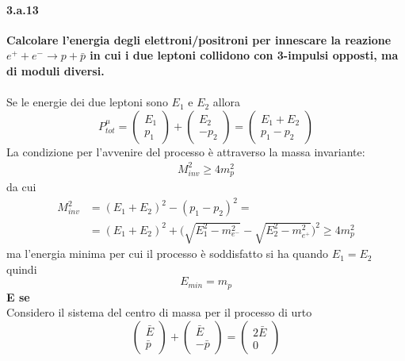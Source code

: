 \documentclass[twoside]{article}
\begin{document}
\paragraph{3.a.13}\textbf{Calcolare l'energia degli elettroni/positroni per innescare la reazione $e^+ +e^-\longrightarrow p+\bar{p}$ in cui i due leptoni collidono con 3-impulsi opposti, ma di moduli diversi.}\\
\\
Se le energie dei due leptoni sono $E_1$ e $ E_2$ allora
\begin{equation}
    P^{\mu}_{tot}=\left(\begin{array}{lr}
         E_1  \\
         p_1
    \end{array}\right)+\left(\begin{array}{lr}
         E_2  \\
         -p_2 
    \end{array}\right)=\left(\begin{array}{lr}
         E_1+E_2  \\
         p_1-p_2 
    \end{array}\right)
\end{equation}
La condizione per l'avvenire del processo è attraverso la massa invariante:
\begin{align}
    M_{inv}^2\geq4m_p^2
\end{align}
da cui
\begin{align}
    M_{inv}^2&=(E_1+E_2)^2-(p_1-p_2)^2=\\
    &=(E_1+E_2)^2+\biggl(\sqrt{E_1^2-m_{e^-}^2}-\sqrt{E_2^2-m_{e^+}^2}\biggr)^2\ge4m_p^2
\end{align}
ma l'energia minima per cui il processo è soddisfatto si ha quando $E_1=E_2$ quindi
\begin{equation}
    E_{min}=m_{p}
\end{equation}
\textbf{E se}\\
Considero il sistema del centro di massa per il processo di urto
\begin{equation}
    \left(\begin{array}{lr}
         \bar{E}  \\
         \bar{p} 
    \end{array} \right)+\left(\begin{array}{lr}
         \bar{E}  \\
         -\bar{p} 
    \end{array} \right)=\left(\begin{array}{lr}
         2\bar{E}  \\
         0 
    \end{array} \right)
\end{equation}
\end{document}
